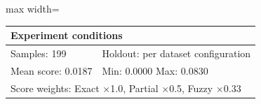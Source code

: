 \begin{table}[htbp]
\begin{adjustbox}{max width=\textwidth}
\begin{tabular}{r p{5cm} r r r r}
\midrule
\multicolumn{6}{l}{\textbf{Experiment conditions}} \\
\midrule
\multicolumn{3}{l}{Samples: 199} & \multicolumn{3}{l}{Holdout: per dataset configuration} \\
\multicolumn{3}{l}{Mean score: 0.0187} & \multicolumn{3}{l}{Min: 0.0000 \quad Max: 0.0830} \\
\multicolumn{6}{l}{Score weights: Exact $\times$1.0, Partial $\times$0.5, Fuzzy $\times$0.33} \\
\bottomrule
\end{tabular}
\end{adjustbox}
\end{table}

